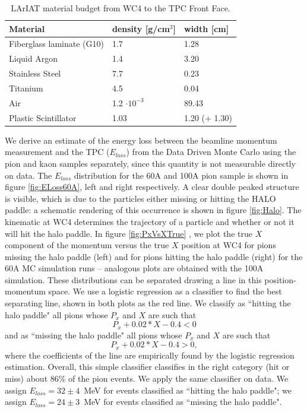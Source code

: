 \begin{table}[h!]
\centering
\begin{tabular}{|l|l|l|}
\hline
Material  & density {[}g/cm$^3${]} & width {[}cm{]}    \\ \hline
Fiberglass laminate (G10)      & 1.7                             & 1.28                              \\
Liquid Argon                           & 1.4                             & 3.20                             \\
Stainless Steel                        & 7.7                            & 0.23                             \\
Titanium                                  & 4.5                            & 0.04                             \\ 
Air                                            &  1.2 $\cdot10^{-3}$  & 89.43                              \\
Plastic Scintillator                    & 1.03                          & 1.20 (+ 1.30)                             \\ \hline
\end{tabular}
\caption{LArIAT material budget from WC4 to the TPC Front Face.}
\label{tab:budget}
\end{table}


We derive an estimate of the energy loss between the beamline momentum measurement and the TPC ($E_{loss}$) from the Data Driven Monte Carlo using the pion and kaon samples separately, since this quantity is not  measurable directly on data. 
The $E_{loss}$ distribution for the 60A  and 100A pion sample is shown in figure \ref{fig:ELoss60A}, left and right respectively. A clear double peaked structure is visible, which is due to the particles either missing or hitting the HALO paddle: a schematic rendering of this occurrence is  shown in figure \ref{fig:Halo}. The kinematic at WC4 determines the trajectory of a particle and whether or not it will hit the halo paddle. In figure \ref{fig:PxVsXTrue} , we plot the true  $X$ component of the momentum versus the true $X$ position at WC4 for pions missing the halo paddle (left) and for pions hitting the halo paddle (right) for the 60A MC simulation runs -- analogous plots are obtained with the 100A simulation. These distributions can be separated drawing a line in this position-momentum space. 
We use a logistic regression  \cite{agresti2013categorical}  as a classifier to find the best separating line, shown in both plots as the red line. We classify as ``hitting the halo paddle" all pions whose $P_x$ and $X$ are such that $$P_x +0.02* X - 0.4 < 0 $$ and as ``missing the halo  paddle" all pions whose $P_x$ and $X$ are such that $$P_x +0.02*X - 0.4 > 0, $$ where the coefficients of the line are empirically found by the logistic regression estimation. Overall, this simple classifier classifies in the right category (hit or miss) about 86\% of the pion events.
We apply the same classifier on data. We assign  $E_{loss} = 32 \pm 4 $~MeV for events classified as ``hitting the halo paddle"; we assign  $E_{loss} = 24 \pm 3 $~MeV for events classified as ``missing the halo paddle".

